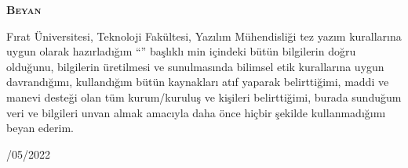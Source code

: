 \begin{titlepage}

\begin{center}
\begin{large}
\vspace{-1cm}
\bfseries \Large\textbf{\textsc{Beyan}}\\
\end{large}
\end{center}

\begin{spacing}{1.25}
\begin{justify}
\begin{footnotesize}

\setlength{\parindent}{1cm}
\hspace{1cm}Fırat Üniversitesi, Teknoloji Fakültesi, Yazılım Mühendisliği tez yazım kurallarına uygun olarak hazırladığım “\tezbasligi” başlıklı \derece min içindeki bütün bilgilerin doğru olduğunu, bilgilerin üretilmesi ve sunulmasında bilimsel etik kurallarına uygun davrandığımı, kullandığım bütün kaynakları atıf yaparak belirttiğimi, maddi ve manevi desteği olan tüm kurum/kuruluş ve kişileri belirttiğimi, burada sunduğum veri ve bilgileri unvan almak amacıyla daha önce hiçbir şekilde kullanmadığımı beyan ederim.
\vspace{0.7cm}
\end{footnotesize}
\end{justify}
\end{spacing}
{\small{}/05/2022\\\vspace{1cm}}
\raggedleft{\small\textbf{\tezyazari}}
\newpage
\end{titlepage}


